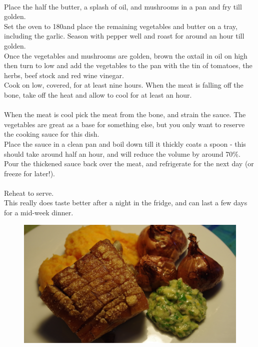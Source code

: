\documentclass{tufte-book}
\begin{document}
\smallskip
{} 
\\Place the half the butter, a splash of oil, and mushrooms in a pan and fry till golden.
\\Set the oven to 180\celsius and place the remaining vegetables and butter on a tray, including the garlic. Season with pepper well and roast for around an hour till golden.
\\Once the vegetables and mushrooms are golden, brown the oxtail in oil on high then turn to low and add the vegetables to the pan with the tin of tomatoes, the herbs, beef stock and red wine vinegar.
\\Cook on low, covered, for at least nine hours. When the meat is falling off the bone, take off the heat and allow to cool for at least an hour.
\\
\\When the meat is cool pick the meat from the bone, and strain the sauce. The vegetables are great as a base for something else, but you only want to reserve the cooking sauce for this dish. 
\\Place the sauce in a clean pan and boil down till it thickly coats a spoon - this should take around half an hour, and will reduce the volume by around 70\%.
\\Pour the thickened sauce back over the meat, and refrigerate for the next day (or freeze for later!). 
\\
\\Reheat to serve.
\\This really does taste better after a night in the fridge, and can last a few days for a mid-week dinner.

\newpage

\begin{figure}[h]
  \includegraphics[width=\linewidth]{roastpork2}
\end{figure}
\end{document}
